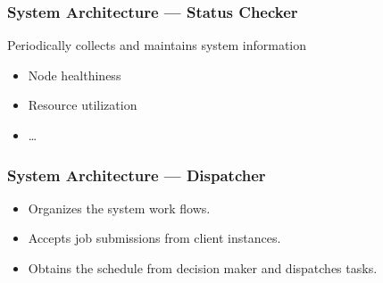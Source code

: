 \begin{frame}
  \frametitle{System Architecture --- Status Checker}
  Periodically collects and maintains system information
  \begin{itemize}
    \item Node healthiness
    \item Resource utilization
    \item \ldots
  \end{itemize}
\end{frame}
\begin{frame}
  \frametitle{System Architecture --- Dispatcher}
  \begin{itemize}
    \item Organizes the system work flows.
    \item Accepts job submissions from client instances.
    \item Obtains the schedule from decision maker and dispatches
      tasks.
  \end{itemize}
\end{frame}

